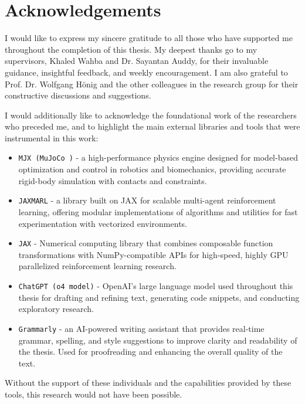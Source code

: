 \chapter*{Acknowledgements}
\thispagestyle{empty}

I would like to express my sincere gratitude to all those who have supported me throughout the completion of this thesis. My deepest thanks go to my supervisors, Khaled Wahba and Dr. Sayantan Auddy, for their invaluable guidance, insightful feedback, and weekly encouragement. I am also grateful to Prof. Dr. Wolfgang Hönig and the other colleagues in the research group for their constructive discussions and suggestions.

I would additionally like to acknowledge the foundational work of the researchers who preceded me, and to highlight the main external libraries and tools that were instrumental in this work:

\begin{itemize}
  \item \texttt{MJX (MuJoCo \cite{todorov2012mujoco})} - a high-performance physics engine designed for model-based optimization and control in robotics and biomechanics, providing accurate rigid-body simulation with contacts and constraints.
  \item \texttt{JAXMARL} \cite{flair2023jaxmarl}  - a library built on JAX for scalable multi-agent reinforcement learning, offering modular implementations of algorithms and utilities for fast experimentation with vectorized environments.
  \item \texttt{JAX} \cite{jax2018github} - Numerical computing library that combines composable function transformations with NumPy-compatible APIs for high-speed, highly GPU parallelized reinforcement learning research.
  \item \texttt{ChatGPT (o4 model)} - OpenAI's large language model used throughout this thesis for drafting and refining text, generating code snippets, and conducting exploratory research.
  \item \texttt{Grammarly} - an AI-powered writing assistant that provides real-time grammar, spelling, and style suggestions to improve clarity and readability of the thesis. Used for proofreading and enhancing the overall quality of the text.
\end{itemize}

\vspace{1em}
\noindent
Without the support of these individuals and the capabilities provided by these tools, this research would not have been possible.
